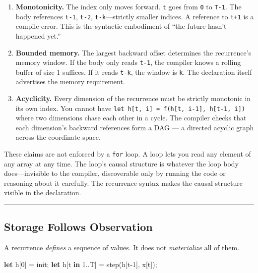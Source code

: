 \documentclass[11pt,]{article}
\newenvironment{Shaded}{}{}
\newcommand{\DecValTok}[1]{\textcolor[rgb]{0.25,0.63,0.44}{#1}}
\newcommand{\KeywordTok}[1]{\textcolor[rgb]{0.00,0.44,0.13}{\textbf{#1}}}
\newcommand{\NormalTok}[1]{#1}
\newcommand{\OperatorTok}[1]{\textcolor[rgb]{0.40,0.40,0.40}{#1}}
\begin{document}
\begin{enumerate}
\def\labelenumi{\arabic{enumi}.}
\item
  \textbf{Monotonicity.} The index only moves forward. \texttt{t} goes
  from \texttt{0} to \texttt{T-1}. The body references \texttt{t-1},
  \texttt{t-2}, \texttt{t-k}---strictly smaller indices. A reference to
  \texttt{t+1} is a compile error. This is the syntactic embodiment of
  ``the future hasn't happened yet.''
\item
  \textbf{Bounded memory.} The largest backward offset determines the
  recurrence's memory window. If the body only reads \texttt{t-1}, the
  compiler knows a rolling buffer of size 1 suffices. If it reads
  \texttt{t-k}, the window is \texttt{k}. The declaration itself
  advertises the memory requirement.
\item
  \textbf{Acyclicity.} Every dimension of the recurrence must be
  strictly monotonic in its own index. You cannot have
  \texttt{let\ h{[}t,\ i{]}\ =\ f(h{[}t,\ i-1{]},\ h{[}t-1,\ i{]})}
  where two dimensions chase each other in a cycle. The compiler checks
  that each dimension's backward references form a DAG --- a directed
  acyclic graph across the coordinate space.
\end{enumerate}

These claims are not enforced by a \texttt{for} loop. A loop lets you
read any element of any array at any time. The loop's causal structure
is whatever the loop body does---invisible to the compiler, discoverable
only by running the code or reasoning about it carefully. The recurrence
syntax makes the causal structure visible in the declaration.

\begin{center}\rule{0.5\linewidth}{0.4pt}\end{center}

\hypertarget{storage-follows-observation}{%
\subsection{Storage Follows
Observation}\label{storage-follows-observation}}

A recurrence \emph{defines} a sequence of values. It does not
\emph{materialize} all of them.

\begin{Shaded}
\begin{Highlighting}[]
\KeywordTok{let}\NormalTok{ h}\OperatorTok{[}\DecValTok{0}\OperatorTok{]}\NormalTok{ = init;}
\KeywordTok{let}\NormalTok{ h}\OperatorTok{[}\NormalTok{t }\KeywordTok{in} \DecValTok{1.}\NormalTok{.T}\OperatorTok{]}\NormalTok{ = step(h}\OperatorTok{[}\NormalTok{t-}\DecValTok{1}\OperatorTok{]}\NormalTok{, x}\OperatorTok{[}\NormalTok{t}\OperatorTok{]}\NormalTok{);}
\end{Highlighting}
\end{Shaded}
\end{document}
